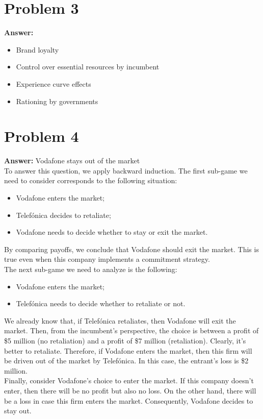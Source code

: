 \documentclass[11pt]{article}
\begin{document}
\section*{Problem 3}
\label{sec:orgb1ea1f4}

\textbf{Answer:}
\begin{itemize}
\item Brand loyalty
\item Control over essential resources by incumbent
\item Experience curve effects
\item Rationing by governments
\end{itemize}
\section*{Problem 4}
\label{sec:orgce6e5a0}

\textbf{Answer:} Vodafone stays out of the market\\

To answer this question, we apply backward induction. The first sub-game we need
to consider corresponds to the following situation:
\begin{itemize}
\item Vodafone enters the market;
\item Telefónica decides to retaliate;
\item Vodafone needs to decide whether to stay or exit the market.
\end{itemize}
By comparing payoffs, we conclude that Vodafone should exit the market. This is
true even when this company implements a commitment strategy.\\
The next sub-game we need to analyze is the following:
\begin{itemize}
\item Vodafone enters the market;
\item Telefónica needs to decide whether to retaliate or not.
\end{itemize}
We already know that, if Telefónica retaliates, then Vodafone will exit the
market. Then, from the incumbent's perspective, the choice is between a profit
of \$5 million (no retaliation) and a profit of \$7 million (retaliation).
Clearly, it's better to retaliate. Therefore, if Vodafone enters the market,
then this firm will be driven out of the market by Telefónica. In this case, the
entrant's loss is \$2 million.\\
Finally, consider Vodafone's choice to enter the market. If this company doesn't
enter, then there will be no profit but also no loss. On the other hand, there
will be a loss in case this firm enters the market. Consequently, Vodafone
decides to stay out.
\end{document}
